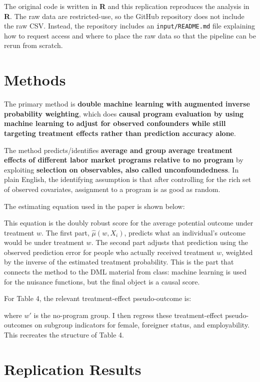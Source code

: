 \documentclass[12pt]{article}
\begin{document}
The original code is written in \textbf{R} and this replication reproduces the analysis in \textbf{R}. The raw data are restricted-use, so the GitHub repository does not include the raw CSV. Instead, the repository includes an \texttt{input/README.md} file explaining how to request access and where to place the raw data so that the pipeline can be rerun from scratch.

\section{Methods}

The primary method is \textbf{double machine learning with augmented inverse probability weighting}, which does \textbf{causal program evaluation by using machine learning to adjust for observed confounders while still targeting treatment effects rather than prediction accuracy alone}.

The method predicts/identifies \textbf{average and group average treatment effects of different labor market programs relative to no program} by exploiting \textbf{selection on observables, also called unconfoundedness}. In plain English, the identifying assumption is that after controlling for the rich set of observed covariates, assignment to a program is as good as random.

The estimating equation used in the paper is shown below:



This equation is the doubly robust score for the average potential outcome under treatment $w$. The first part, $\hat{\mu}(w, X_i)$, predicts what an individual’s outcome would be under treatment $w$. The second part adjusts that prediction using the observed prediction error for people who actually received treatment $w$, weighted by the inverse of the estimated treatment probability. This is the part that connects the method to the DML material from class: machine learning is used for the nuisance functions, but the final object is a causal score.

For Table 4, the relevant treatment-effect pseudo-outcome is:



where $w'$ is the no-program group. I then regress these treatment-effect pseudo-outcomes on subgroup indicators for female, foreigner status, and employability. This recreates the structure of Table 4.

\section{Replication Results}
\end{document}

